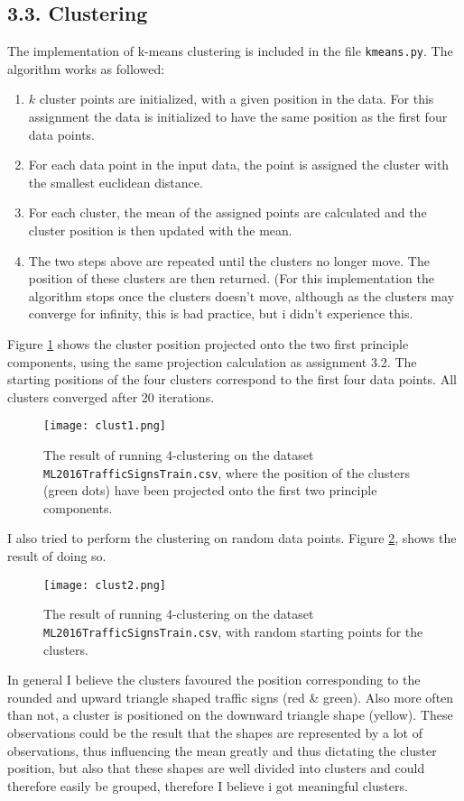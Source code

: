 \documentclass{article}
\begin{document}
\subsection{3.3. Clustering}
The implementation of k-means clustering is included in the file \texttt{kmeans.py}. The algorithm works as followed:
\begin{enumerate}
\item{$k$ cluster points are initialized, with a given position in the data. For this assignment the data is initialized to have the same position as the first four data points.}
\item{For each data point in the input data, the point is assigned the cluster with the smallest euclidean distance.}
\item{For each cluster, the mean of the assigned points are calculated
and the cluster position is then updated with the mean.
}
\item{The two steps above are repeated until the clusters no longer move. The position of these clusters are then returned. (For this implementation the algorithm stops once the clusters doesn't move, although as the clusters may converge for infinity, this is bad practice, but i didn't experience this.}
\end{enumerate}
Figure \ref{fig:clust1} shows the cluster position projected onto the two first principle components, using the same projection calculation as assignment 3.2. The starting positions of the four clusters correspond to the first four data points. All clusters converged after 20 iterations.
\begin{figure}[H]
  \centering
  \texttt{[image: clust1.png]}
  \caption{The result of running 4-clustering on the dataset \texttt{ML2016TrafficSignsTrain.csv}, where the position of the clusters (green dots) have been projected onto the first two principle components.
  }
  \label{fig:clust1}
\end{figure}
I also tried to perform the clustering on random data points. Figure \ref{fig:clust2}, shows the result of doing so.
\begin{figure}[H]
  \centering
  \texttt{[image: clust2.png]}
  \caption{The result of running 4-clustering on the dataset \texttt{ML2016TrafficSignsTrain.csv}, with random starting points for the clusters.
  }
  \label{fig:clust2}
\end{figure}
In general I believe the clusters favoured the position corresponding to the rounded and upward triangle shaped traffic signs (red \& green). Also more often than not, a cluster is positioned on the downward triangle shape (yellow).  These observations could be the result that the shapes are represented by a lot of observations, thus influencing the mean greatly and thus dictating the cluster position, but also  that these shapes are well divided into clusters and could therefore easily be grouped, therefore I believe i got meaningful clusters.
\end{document}
